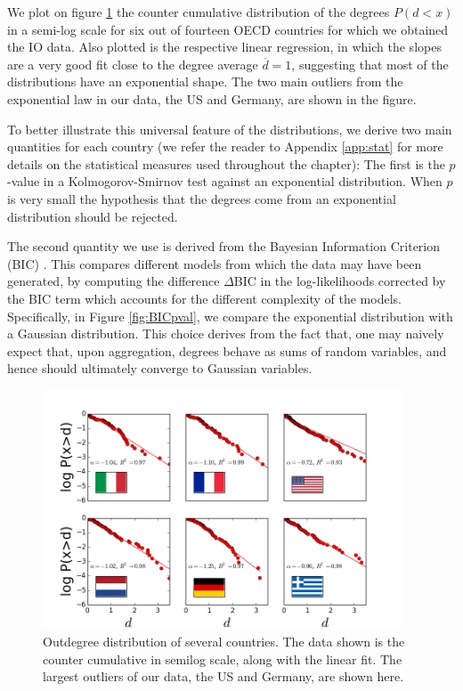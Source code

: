 We plot on figure \ref{fig:6countries} the counter cumulative distribution
of the degrees $P(d < x)$ in a semi-log scale for six out of fourteen
OECD countries for which we obtained the IO data. Also plotted is the
respective linear regression, in which the slopes are a very good fit
close to the degree average $\overline{d}=1$, suggesting that most of the
distributions have an exponential shape. The two main outliers from
the exponential law in our data, the US and Germany, are shown in the
figure.

To better illustrate this universal feature of the distributions, we
derive two main quantities for each country (we refer the reader to
Appendix \ref{app:stat} for more details on the statistical measures used throughout the chapter): The first is the $p$-value in a Kolmogorov-Smirnov 
test against an exponential distribution.%
When $p$ is very small the hypothesis that the degrees come from an
exponential distribution should be rejected. 

The second quantity we use is derived from the Bayesian Information Criterion (BIC)
\cite{Kass95}. This compares different models from which the data may have been generated,
by computing the difference $\Delta$BIC in the log-likelihoods corrected by the BIC term which accounts for
the different complexity of the models. 
Specifically, in Figure \ref{fig:BICpval}, we compare the exponential distribution with a Gaussian distribution. 
This choice derives from the fact that, one may naively expect that, upon aggregation, degrees 
behave as sums of random variables, and hence should ultimately converge to Gaussian variables. 


\begin{figure}[!ht]
  \centering
  \includegraphics[width=0.95\textwidth]{figs_io/6panel_data.png}
  \caption{Outdegree distribution of several countries. The data shown
    is the counter cumulative in semilog scale, along with the linear
    fit. The largest outliers of our data, the US and Germany, are
    shown here.}
  \label{fig:6countries}
\end{figure}


